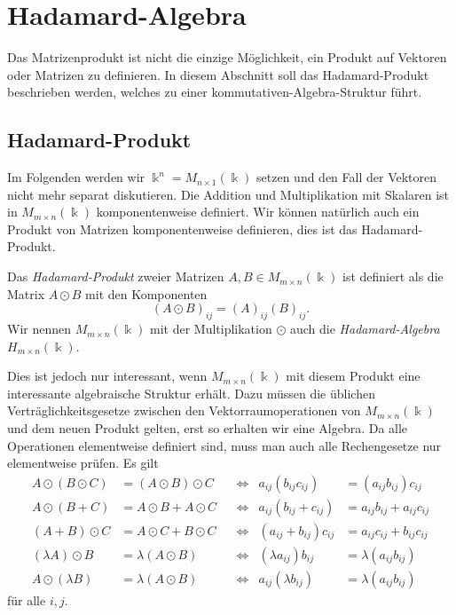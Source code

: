%
%
%
\section{Hadamard-Algebra
\label{buch:section:hadamard-algebra}}
Das Matrizenprodukt ist nicht die einzige Möglichkeit, ein Produkt auf
Vektoren oder Matrizen zu definieren.
In diesem Abschnitt soll das Hadamard-Produkt beschrieben werden,
welches zu einer kommutativen-Algebra-Struktur führt.

%
%
\subsection{Hadamard-Produkt
\label{buch:vektorenmatrizen:subsection:hadamard-produkt}}
Im Folgenden werden wir $\Bbbk^n =M_{n\times 1}(\Bbbk)$ setzen
und den Fall der Vektoren nicht mehr separat diskutieren.
Die Addition und Multiplikation mit Skalaren ist in 
$M_{m\times n}(\Bbbk)$ komponentenweise definiert.
Wir können natürlich auch ein Produkt von Matrizen komponentenweise definieren,
dies ist das Hadamard-Produkt.

\begin{definition}
Das {\em Hadamard-Produkt} zweier Matrizen
%
$A,B\in M_{m\times n}(\Bbbk)$ ist definiert als die Matrix
$A\odot B$ 
mit den Komponenten
\[
(A\odot B)_{i\!j} = (A)_{i\!j} (B)_{i\!j}.
\]
Wir nennen $M_{m\times n}(\Bbbk)$ mit der Multiplikation $\odot$ 
auch die {\em Hadamard-Algebra} $H_{m\times n}(\Bbbk)$.
%
\end{definition}

Dies ist jedoch nur interessant, wenn $M_{m\times n}(\Bbbk)$ mit diesem
Produkt eine interessante algebraische Struktur erhält.
Dazu müssen die üblichen Verträglichkeitsgesetze zwischen den
Vektorraumoperationen von $M_{m\times n}(\Bbbk)$ und dem neuen Produkt
gelten, erst so erhalten wir eine Algebra.
Da alle Operationen elementweise definiert sind, muss man auch alle
Rechengesetze nur elementweise prüfen.
Es gilt
\[
\begin{aligned}
A\odot(B\odot C) &= (A\odot B)\odot C
&&\Leftrightarrow&
a_{i\!j}(b_{i\!j}c_{i\!j}) &= (a_{i\!j}b_{i\!j})c_{i\!j}
\\
A\odot(B+C) &= A\odot B + A\odot C
&&\Leftrightarrow&
a_{i\!j}(b_{i\!j}+c_{i\!j}) &= a_{i\!j}b_{i\!j} + a_{i\!j}c_{i\!j}
\\
(A+B)\odot C&=A\odot C+B\odot C
&&\Leftrightarrow&
(a_{i\!j}+b_{i\!j})c_{i\!j}&=a_{i\!j}c_{i\!j} + b_{i\!j}c_{i\!j}
\\
(\lambda A)\odot B &= \lambda (A\odot B)
&&\Leftrightarrow&
(\lambda a_{i\!j})b_{i\!j}&=\lambda(a_{i\!j}b_{i\!j})
\\
A\odot(\lambda B)&=\lambda(A\odot B)
&&\Leftrightarrow&
a_{i\!j}(\lambda b_{i\!j})&=\lambda(a_{i\!j}b_{i\!j})
\end{aligned}
\]
für alle $i,j$.

